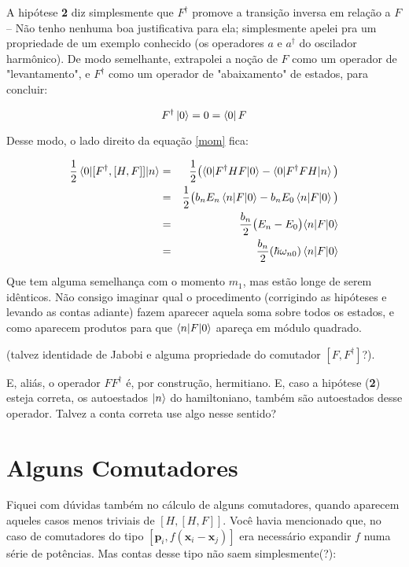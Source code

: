 \documentclass[12pt]{article}
\begin{document}
A hipótese \textbf{2} diz simplesmente que $F^\dagger$ promove a transição inversa em relação a $F$ -- Não tenho nenhuma boa justificativa para ela; simplesmente apelei pra um propriedade de um exemplo conhecido (os operadores $a$ e $a^\dagger$ do oscilador harmônico). De modo semelhante, extrapolei a noção de $F$ como um operador de "levantamento", e $F^\dagger$ como um operador de "abaixamento" de estados, para concluir:

\begin{equation}
F^\dagger \ket{0} = 0 = \bra{0}F
\end{equation}

Desse modo, o lado direito da equação \ref{mom} fica:

\begin{eqnarray}
\frac{1}{2}\braket{0|[F^\dagger,[H,F]]|n} &=& \frac{1}{2}\bigl(\braket{0|F^\dagger HF|0} - \braket{0|F^\dagger F H|n} \bigl) \\
&=& \frac{1}{2}\bigl(b_nE_n\braket{n|F|0} - b_nE_0\braket{n|F|0} \bigl) \\
&=& \frac{b_n}{2}\bigl(E_n - E_0 \bigl)\braket{n|F|0} \\
&=& \frac{b_n}{2} (\hbar \omega_{n0}) \braket{n|F|0}
\end{eqnarray}

Que tem alguma semelhança com o momento $m_1$, mas estão longe de serem idênticos. Não consigo imaginar qual o procedimento (corrigindo as hipóteses e levando as contas adiante) fazem aparecer aquela soma sobre todos os estados, e como aparecem produtos para que $\braket{n|F|0}$ apareça em módulo quadrado.
\vspace{0.2cm}

(talvez identidade de Jabobi e alguma propriedade do comutador $[F,F^\dagger]$?).
\vspace{0.7cm}

E, aliás, o operador $FF^\dagger$ é, por construção, hermitiano. E, caso a hipótese (\textbf{2}) esteja correta, os autoestados $\ket{n}$ do hamiltoniano, também são autoestados desse operador. Talvez a conta correta use algo nesse sentido?

\section{Alguns Comutadores}

Fiquei com dúvidas também no cálculo de alguns comutadores, quando aparecem aqueles casos menos triviais de $[H,[H,F]]$. Você havia mencionado que, no caso de comutadores do tipo $[\mathbf{p}_i,f(\mathbf{x}_i-\mathbf{x}_j)]$ era necessário expandir $f$ numa série de potências. Mas contas desse tipo não saem simplesmente(?):
\end{document}
